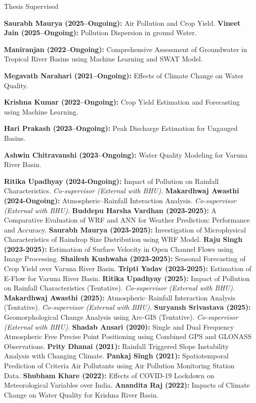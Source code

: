 \begin{rubric}{Thesis Supervised}

\entry*{} \textbf{Saurabh Maurya (2025--Ongoing):} Air Pollution and Crop Yield.
\entry*{} \textbf{Vineet Jain  (2025--Ongoing):} Pollution Dispersion in ground Water.

\entry*{} \textbf{Maniranjan (2022--Ongoing):} Comprehensive Assessment of Groundwater in Tropical River Basins using Machine Learning and SWAT Model.

\entry*{} \textbf{Megavath Narahari (2021--Ongoing):} Effects of Climate Change on Water Quality.

\entry*{} \textbf{Krishna Kumar (2022--Ongoing):} Crop Yield Estimation and Forecasting using Machine Learning.

\entry*{} \textbf{Hari Prakash (2023--Ongoing):} Peak Discharge Estimation for Ungauged Basins.

\entry*{} \textbf{Ashwin Chitravanshi (2023--Ongoing):} Water Quality Modeling for Varuna River Basin.



\entry*{} \textbf{Ritika Upadhyay (2024-Ongoing):} Impact of Pollution on Rainfall Characteristics. \emph{Co-supervisor (External with BHU).}
\entry*{} \textbf{Makardhwaj Awasthi (2024-Ongoing):} Atmospheric–Rainfall Interaction Analysis. \emph{Co-supervisor (External with BHU).}
\entry*{} \textbf{Buddepu Harsha Vardhan (2023-2025):} A Comparative Evaluation of WRF and ANN for Weather Prediction: Performance and Accuracy.
\entry*{} \textbf{Saurabh Maurya (2023-2025):} Investigation of Microphysical Characteristics of Raindrop Size Distribution using WRF Model.
\entry*{} \textbf{Raju Singh (2023-2025):} Estimation of Surface Velocity in Open Channel Flows using Image Processing.
\entry*{} \textbf{Shailesh Kushwaha (2023-2025):} Seasonal Forecasting of Crop Yield over Varuna River Basin.
\entry*{} \textbf{Tripti Yadav (2023-2025):} Estimation of E-Flow for Varuna River Basin.
\entry*{} \textbf{Ritika Upadhyay (2025):} Impact of Pollution on Rainfall Characteristics (Tentative). \emph{Co-supervisor (External with BHU).}
\entry*{} \textbf{Makardhwaj Awasthi (2025):} Atmospheric--Rainfall Interaction Analysis (Tentative). \emph{Co-supervisor (External with BHU).}
\entry*{} \textbf{Suryansh Srivastava (2025):} Geomorphological Change Analysis using Arc-GIS (Tentative). \emph{Co-supervisor (External with BHU).}
\entry*{} \textbf{Shadab Ansari (2020):} Single and Dual Frequency Atmospheric Free Precise Point Positioning using Combined GPS and GLONASS Observations.
\entry*{} \textbf{Prity Dhanai (2021):} Rainfall Triggered Slope Instability Analysis with Changing Climate.
\entry*{} \textbf{Pankaj Singh (2021):} Spatiotemporal Prediction of Criteria Air Pollutants using Air Pollution Monitoring Station Data.
\entry*{} \textbf{Shubham Khare (2022):} Effects of COVID-19 Lockdown on Meteorological Variables over India.
\entry*{} \textbf{Anandita Raj (2022):} Impacts of Climate Change on Water Quality for Krishna River Basin.


\end{rubric}
